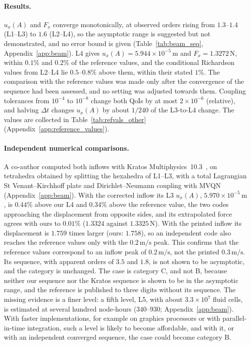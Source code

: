 \paragraph{Results.}
$u_x(A)$ and $F_x$ converge monotonically, at observed orders rising from $1.3$--$1.4$ (L1--L3) to $1.6$ (L2--L4), so the asymptotic range is suggested but not demonstrated, and no error bound is given (Table~\ref{tab:beam_seq}, Appendix~\ref{app:beam}).
L4 gives $u_x(A) = 5.944\times10^{-5}\,\mathrm{m}$ and $F_x = 1.3272\,\mathrm{N}$, within $0.1\%$ and $0.2\%$ of the reference values, and the conditional Richardson values from L2--L4 lie $0.5$--$0.8\%$ above them, within their stated $1\%$. The comparison with the reference values was made only after the convergence of the sequence had been assessed, and no setting was adjusted towards them.
Coupling tolerances from $10^{-4}$ to $10^{-8}$ change both QoIs by at most $2\times10^{-6}$ (relative), and halving $\Delta t$ changes $u_x(A)$ by about $1/240$ of the L3-to-L4 change.
The values are collected in Table~\ref{tab:refvals_other} (Appendix~\ref{app:reference_values}).

\paragraph{Independent numerical comparisons.}
A co-author computed both inflows with Kratos Multiphysics~10.3~\citep{Dadvand2010}, on tetrahedra obtained by splitting the hexahedra of L1--L3, with a total Lagrangian St Venant--Kirchhoff plate and Dirichlet--Neumann coupling with MVQN (Appendix~\ref{app:beam}).
With the corrected inflow its L3 $u_x(A)$, $5.970\times10^{-5}\,\mathrm{m}$, is $0.44\%$ above our L4 and $0.34\%$ above the reference value, the two codes approaching the displacement from opposite sides, and its extrapolated force agrees with ours to $0.01\%$ ($1.3324$ against $1.3325\,\mathrm{N}$).
With the printed inflow its displacement is $1.759$ times larger (ours: $1.758$), so an independent code also reaches the reference values only with the $0.2\,\mathrm{m/s}$ peak. This confirms that the reference values correspond to an inflow peak of $0.2\,\mathrm{m/s}$, not the printed $0.3\,\mathrm{m/s}$.
Its sequence, with apparent orders of $3.5$ and $1.8$, is not shown to be asymptotic, and the category is unchanged.
The case is category C, and not B, because neither our sequence nor the Kratos sequence is shown to be in the asymptotic range, and the reference is published to three digits without its sequence. The missing evidence is a finer level: a fifth level, L5, with about $3.3\times10^{7}$ fluid cells, is estimated at several hundred node-hours ($340$--$930$; Appendix~\ref{app:beam}). With faster implementations, for example on graphics processors or with parallel-in-time integration, such a level is likely to become affordable, and with it, or with an independent converged sequence, the case could become category B.

